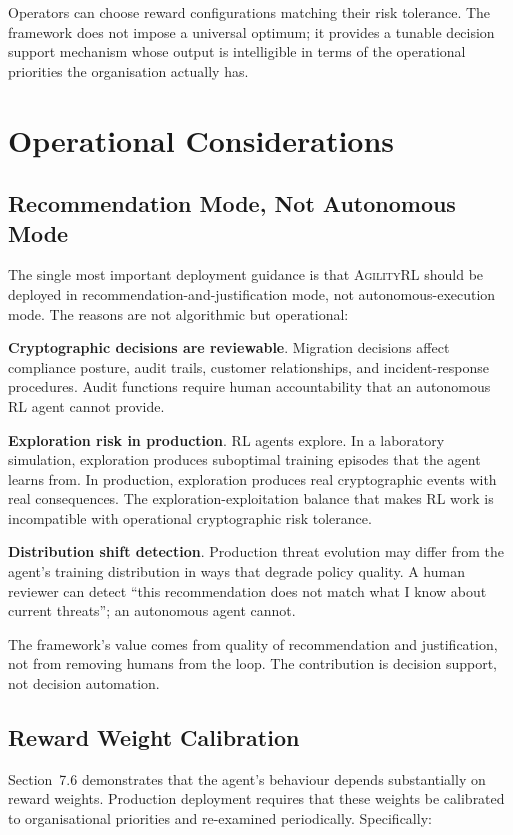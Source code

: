 \documentclass[sigconf,nonacm]{acmart}
\begin{document}
Operators can choose reward configurations matching their risk
tolerance. The framework does not impose a universal optimum; it
provides a tunable decision support mechanism whose output is
intelligible in terms of the operational priorities the
organisation actually has.

\section{Operational Considerations}

\subsection{Recommendation Mode, Not Autonomous Mode}

The single most important deployment guidance is that
\textsc{AgilityRL} should be deployed in
recommendation-and-justification mode, not autonomous-execution mode.
The reasons are not algorithmic but operational:

\textbf{Cryptographic decisions are reviewable}. Migration
decisions affect compliance posture, audit trails, customer
relationships, and incident-response procedures. Audit functions
require human accountability that an autonomous RL agent cannot
provide.

\textbf{Exploration risk in production}. RL agents explore. In a
laboratory simulation, exploration produces suboptimal training
episodes that the agent learns from. In production, exploration
produces real cryptographic events with real consequences. The
exploration-exploitation balance that makes RL work is incompatible
with operational cryptographic risk tolerance.

\textbf{Distribution shift detection}. Production threat evolution
may differ from the agent's training distribution in ways that
degrade policy quality. A human reviewer can detect ``this
recommendation does not match what I know about current threats'';
an autonomous agent cannot.

The framework's value comes from quality of recommendation and
justification, not from removing humans from the loop. The
contribution is decision support, not decision automation.

\subsection{Reward Weight Calibration}

Section~7.6 demonstrates that the agent's behaviour depends
substantially on reward weights. Production deployment requires
that these weights be calibrated to organisational priorities and
re-examined periodically. Specifically:
\end{document}
